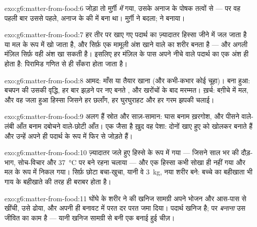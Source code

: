 \begin{solution}{exo:g6:matter-from-food:6}
जोड़ा तो मुर्ग़ी \emph{में} गया, उसके अनाज के पोषक तत्वों से --- पर वह
 पहली बार उससे पहले, अनाज के  की  में बना था।
मुर्ग़ी ने बदला;  ने बनाया।
\end{solution}

\begin{solution}{exo:g6:matter-from-food:7}
हर तीर पर खाए गए पदार्थ का ज़्यादातर हिस्सा जीने में जल जाता है या मल के
रूप में खो जाता है, और सिर्फ़ एक मामूली अंश खाने वाले का शरीर बनता है ---
और अगली मंज़िल सिर्फ़ वही अंश खा सकती है। इसलिए हर मंज़िल के पास अपने
नीचे वाले पदार्थ का एक अंश ही होता है: पिरामिड गणित से ही सँकरा होता
जाता है।
\end{solution}

\begin{solution}{exo:g6:matter-from-food:8}
आमद: माँस या तैयार खाना (और कभी-कभार कोई चूहा)। बना हुआ: बचपन की उसकी
वृद्धि, हर बार झड़ने पर नए बनते , और खरोंचों के बाद मरम्मत। ख़र्च:
बग़ीचे में मल, और वह जला हुआ हिस्सा जिसने हर छलाँग, हर घुरघुराहट और हर
गरम झपकी चलाई।
\end{solution}

\begin{solution}{exo:g6:matter-from-food:9}
अलग हैं स्रोत और साज़-सामान: घास बनाम ख़रगोश, और पीसने वाले-लंबी आँत
बनाम दबोचने वाले-छोटी आँत। एक जैसा है ख़ुद वह पेशा: दोनों खाए हुए
 को खोलकर  बनाते हैं और उन्हें अपने ही पदार्थ के
रूप में फिर से जोड़ते हैं।
\end{solution}

\begin{solution}{exo:g6:matter-from-food:10}
ज़्यादातर जले हुए हिस्से के रूप में गया --- जिसने साल भर की दौड़-भाग,
सोच-विचार और \qty{37}{\degreeCelsius} पर बने रहना चलाया --- और एक
हिस्सा कभी सोखा ही नहीं गया और मल के रूप में निकल गया। सिर्फ़ छोटा
बचा-खुचा, यानी वे \qty{3}{kg}, नया शरीर बने: बच्चे का बहीखाता भी गाय के
बहीखाते की तरह ही बराबर होता है।
\end{solution}

\begin{solution}{exo:g6:matter-from-food:11}
घोंघे के शरीर ने  की खनिज सामग्री अपने भोजन और आस-पास से खींची, उसे
ढोया, और अपनी ही बनावट में परत दर परत जमा दिया। पदार्थ खनिज है; पर
\emph{बनाना} उस जीवित  का काम है --- यानी खनिज सामग्री से बनी एक
बनाई हुई चीज़।
\end{solution}

